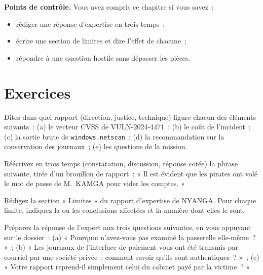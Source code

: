 \begin{boxinfo}
\textbf{Points de contrôle.} Vous avez compris ce chapitre si vous savez~:
\begin{itemize}
    \item rédiger une réponse d'expertise en trois temps~;
    \item écrire une section de limites et dire l'effet de chacune~;
    \item répondre à une question hostile sans dépasser les pièces.
\end{itemize}
\end{boxinfo}

\section*{Exercices}

\begin{boxexo}[title={\ding{45}\quad Exercice~15.1. Quel rapport~? \niveaubase}]
Dites dans quel rapport (direction, justice, technique) figure chacun des
éléments suivants~: (a) le vecteur CVSS de VULN-2024-4471~; (b) le coût de
l'incident~; (c) la sortie brute de \texttt{windows.netscan}~; (d) la
recommandation sur la conservation des journaux~; (e) les questions de la
mission.
\end{boxexo}

\begin{boxexo}[title={\ding{45}\quad Exercice~15.2. Réécrire une conclusion \niveaumoyen}]
Réécrivez en trois temps (constatation, discussion, réponse cotée) la phrase
suivante, tirée d'un brouillon de rapport~: « Il est évident que les
pirates ont volé le mot de passe de M.~KAMGA pour vider les comptes. »
\end{boxexo}

\begin{boxexo}[title={\ding{45}\quad Exercice~15.3. La section des limites \niveaumoyen}]
Rédigez la section « Limites » du rapport d'expertise de NYANGA. Pour chaque
limite, indiquez la ou les conclusions affectées et la manière dont elles le
sont.
\end{boxexo}

\begin{boxexo}[title={\ding{45}\quad Exercice~15.4. Trois questions hostiles \niveauexpert}]
Préparez la réponse de l'expert aux trois questions suivantes, en vous
appuyant sur le dossier~: (a) « Pourquoi n'avez-vous pas examiné la
passerelle elle-même~? »~; (b) « Les journaux de l'interface de paiement
vous ont été transmis par courriel par une société privée~: comment savoir
qu'ils sont authentiques~? »~; (c) « Votre rapport reprend-il simplement
celui du cabinet payé par la victime~? »
\end{boxexo}

